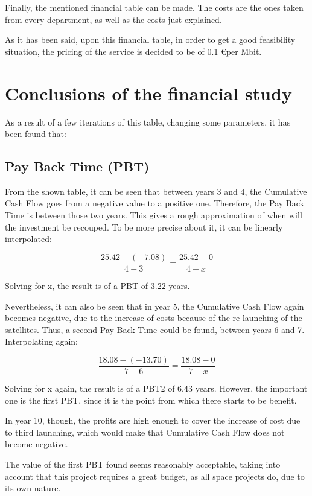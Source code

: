 Finally, the mentioned financial table can be made. The costs are the ones taken from every department, as well as the costs just explained.



As it has been said, upon this financial table, in order to get a good feasibility situation, the pricing of the service is decided to be of 0.1 \euro  per Mbit. 

\section{Conclusions of the financial study}
As a result of a few iterations of this table, changing some parameters, it has been found that:

\subsection{Pay Back Time (PBT)}
From the shown table, it can be seen that between years 3 and 4, the Cumulative Cash Flow goes from a negative value to a positive one. Therefore, the Pay Back Time is between those two years. This gives a rough approximation of when will the investment be recouped. To be more precise about it, it can be linearly interpolated:

\begin{equation}
\frac{25.42-(-7.08)}{4-3}=\frac{25.42-0}{4-x}
\end{equation}

Solving for x, the result is of a PBT of 3.22 years.

Nevertheless, it can also be seen that in year 5, the Cumulative Cash Flow again becomes negative, due to the increase of costs because of the re-launching of the satellites. Thus, a second Pay Back Time could be found, between years 6 and 7. Interpolating again:

\begin{equation}
\frac{18.08-(-13.70)}{7-6}=\frac{18.08-0}{7-x}
\end{equation}

Solving for x again, the result is of a PBT2 of 6.43 years. However, the important one is the first PBT, since it is the point from which there starts to be benefit. 

In year 10, though, the profits are high enough to cover the increase of cost due to third launching, which would make that Cumulative Cash Flow does not become negative. 

The value of the first PBT found seems reasonably acceptable, taking into account that this project requires a great budget, as all space projects do, due to its own nature. 


